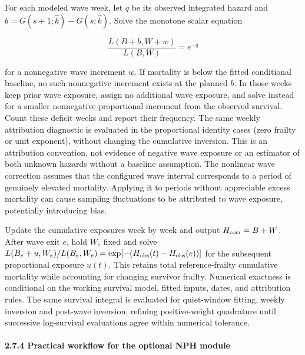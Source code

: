 \documentclass[
]{article}
\begin{document}
For each modeled wave week, let \(q\) be its observed integrated hazard and \(b=G(s+1;\hat k)-G(s;\hat k)\). Solve the monotone scalar equation

\[\frac{L(B+b,W+w)}{L(B,W)}=e^{-q}\]

for a nonnegative wave increment \(w\). If mortality is below the fitted conditional baseline, no such nonnegative increment exists at the planned \(b\). In those weeks keep prior wave exposure, assign no additional wave exposure, and solve instead for a smaller nonnegative proportional increment from the observed survival. Count these deficit weeks and report their frequency. The same weekly attribution diagnostic is evaluated in the proportional identity cases (zero frailty or unit exponent), without changing the cumulative inversion. This is an attribution convention, not evidence of negative wave exposure or an estimator of both unknown hazards without a baseline assumption. The nonlinear wave correction assumes that the configured wave interval corresponds to a period of genuinely elevated mortality. Applying it to periods without appreciable excess mortality can cause sampling fluctuations to be attributed to wave exposure, potentially introducing bias.

Update the cumulative exposures week by week and output \(H_{\rm corr}=B+W\). After wave exit \(e\), hold \(W_e\) fixed and solve \(L(B_e+u,W_e)/L(B_e,W_e)=\exp[-(H_{\rm obs}(t)-H_{\rm obs}(e))]\) for the subsequent proportional exposure \(u(t)\). This retains total reference-frailty cumulative mortality while accounting for changing survivor frailty. Numerical exactness is conditional on the working survival model, fitted inputs, dates, and attribution rules. The same survival integral is evaluated for quiet-window fitting, weekly inversion and post-wave inversion, refining positive-weight quadrature until successive log-survival evaluations agree within numerical tolerance.

\paragraph{2.7.4 Practical workflow for the optional NPH module}\label{practical-workflow-for-the-optional-nph-module}
\end{document}
